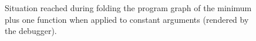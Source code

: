 \begin{figure}[htbp]
	\centering
	\qquad
	\caption{Situation reached during folding the program graph of the minimum plus one function when applied to constant arguments (rendered by the debugger).}
	\label{fig:cmpcondfold}
\end{figure}


